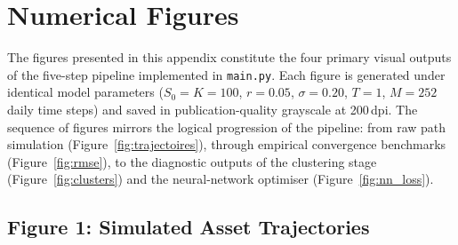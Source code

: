 %
%
%


\chapter{Numerical Figures}
\label{app:figures}

The figures presented in this appendix constitute the four primary
visual outputs of the five-step pipeline implemented in \texttt{main.py}.
Each figure is generated under identical model parameters
($S_0 = K = 100$, $r = 0.05$, $\sigma = 0.20$, $T = 1$, $M = 252$
daily time steps) and saved in publication-quality grayscale at
200\,dpi.  The sequence of figures mirrors the logical progression
of the pipeline: from raw path simulation (Figure~\ref{fig:trajectoires}),
through empirical convergence benchmarks (Figure~\ref{fig:rmse}),
to the diagnostic outputs of the clustering stage
(Figure~\ref{fig:clusters}) and the neural-network optimiser
(Figure~\ref{fig:nn_loss}).

\section{Figure 1: Simulated Asset Trajectories}
\label{app:fig1}

